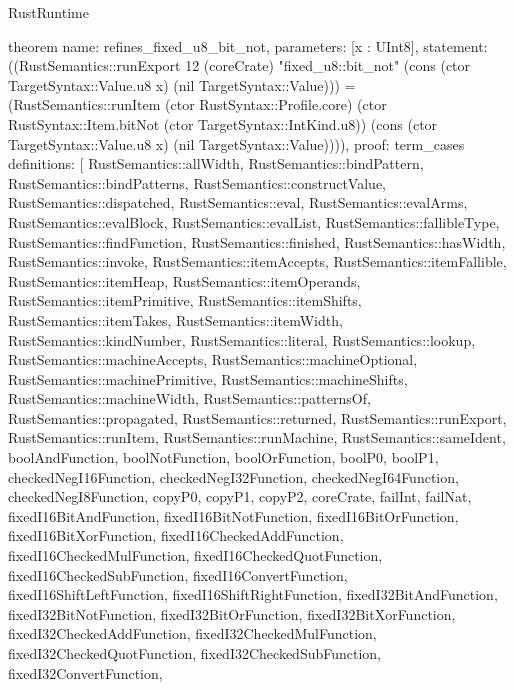 \begin{lexlean}{RustRuntime}
\begin{semanticmodule}
theorem{
  name: refines_fixed_u8_bit_not,
  parameters: [x : UInt8],
  statement: ((RustSemantics::runExport 12 (coreCrate) "fixed_u8::bit_not" (cons (ctor TargetSyntax::Value.u8 x) (nil TargetSyntax::Value))) = (RustSemantics::runItem (ctor RustSyntax::Profile.core) (ctor RustSyntax::Item.bitNot (ctor TargetSyntax::IntKind.u8)) (cons (ctor TargetSyntax::Value.u8 x) (nil TargetSyntax::Value)))),
  proof: term_cases{
    definitions: [
      RustSemantics::allWidth,
      RustSemantics::bindPattern,
      RustSemantics::bindPatterns,
      RustSemantics::constructValue,
      RustSemantics::dispatched,
      RustSemantics::eval,
      RustSemantics::evalArms,
      RustSemantics::evalBlock,
      RustSemantics::evalList,
      RustSemantics::fallibleType,
      RustSemantics::findFunction,
      RustSemantics::finished,
      RustSemantics::hasWidth,
      RustSemantics::invoke,
      RustSemantics::itemAccepts,
      RustSemantics::itemFallible,
      RustSemantics::itemHeap,
      RustSemantics::itemOperands,
      RustSemantics::itemPrimitive,
      RustSemantics::itemShifts,
      RustSemantics::itemTakes,
      RustSemantics::itemWidth,
      RustSemantics::kindNumber,
      RustSemantics::literal,
      RustSemantics::lookup,
      RustSemantics::machineAccepts,
      RustSemantics::machineOptional,
      RustSemantics::machinePrimitive,
      RustSemantics::machineShifts,
      RustSemantics::machineWidth,
      RustSemantics::patternsOf,
      RustSemantics::propagated,
      RustSemantics::returned,
      RustSemantics::runExport,
      RustSemantics::runItem,
      RustSemantics::runMachine,
      RustSemantics::sameIdent,
      boolAndFunction,
      boolNotFunction,
      boolOrFunction,
      boolP0,
      boolP1,
      checkedNegI16Function,
      checkedNegI32Function,
      checkedNegI64Function,
      checkedNegI8Function,
      copyP0,
      copyP1,
      copyP2,
      coreCrate,
      failInt,
      failNat,
      fixedI16BitAndFunction,
      fixedI16BitNotFunction,
      fixedI16BitOrFunction,
      fixedI16BitXorFunction,
      fixedI16CheckedAddFunction,
      fixedI16CheckedMulFunction,
      fixedI16CheckedQuotFunction,
      fixedI16CheckedSubFunction,
      fixedI16ConvertFunction,
      fixedI16ShiftLeftFunction,
      fixedI16ShiftRightFunction,
      fixedI32BitAndFunction,
      fixedI32BitNotFunction,
      fixedI32BitOrFunction,
      fixedI32BitXorFunction,
      fixedI32CheckedAddFunction,
      fixedI32CheckedMulFunction,
      fixedI32CheckedQuotFunction,
      fixedI32CheckedSubFunction,
      fixedI32ConvertFunction,
}}
\end{semanticmodule}
\end{lexlean}
